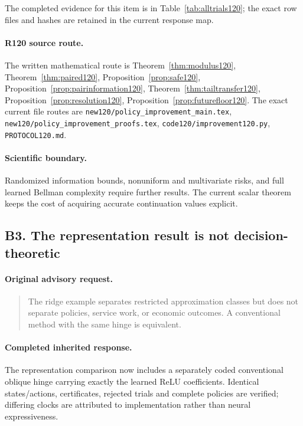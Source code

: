 The completed evidence for this item is in Table~\ref{tab:alltrials120}; the exact row files and hashes are retained in the current response map.
\paragraph{R120 source route.}
The written mathematical route is Theorem~\ref{thm:modulus120}, Theorem~\ref{thm:paired120}, Proposition~\ref{prop:safe120}, Proposition~\ref{prop:pairinformation120}, Theorem~\ref{thm:tailtransfer120}, Proposition~\ref{prop:resolution120}, Proposition~\ref{prop:futurefloor120}. The exact current file routes are \nolinkurl{new120/policy_improvement_main.tex}, \nolinkurl{new120/policy_improvement_proofs.tex}, \nolinkurl{code120/improvement120.py}, \nolinkurl{PROTOCOL120.md}.
\paragraph{Scientific boundary.}
Randomized information bounds, nonuniform and multivariate risks, and full learned Bellman complexity require further results. The current scalar theorem keeps the cost of acquiring accurate continuation values explicit.

\subsection{B3. The representation result is not decision-theoretic}
\label{response120:B3}
\paragraph{Original advisory request.}
\begin{quote}
The ridge example separates restricted approximation classes but does not separate policies, service work, or economic outcomes. A conventional method with the same hinge is equivalent.
\end{quote}
\paragraph{Completed inherited response.}
The representation comparison now includes a separately coded conventional oblique hinge carrying exactly the learned ReLU coefficients. Identical states/actions, certificates, rejected trials and complete policies are verified; differing clocks are attributed to implementation rather than neural expressiveness.

